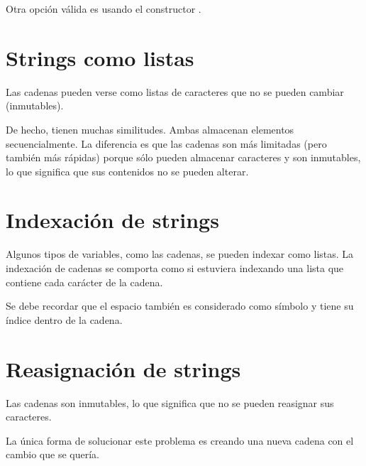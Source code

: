 
Otra opción válida es usando el constructor .


\section{Strings como listas}

Las cadenas pueden verse como listas de caracteres que no se pueden cambiar (inmutables).


De hecho, tienen muchas similitudes. Ambas almacenan elementos secuencialmente. La diferencia es que las cadenas son más limitadas (pero también más rápidas) porque sólo pueden almacenar caracteres y son inmutables, lo que significa que sus contenidos no se pueden alterar.

\section{Indexación de strings}

Algunos tipos de variables, como las cadenas, se pueden indexar como listas. La indexación de cadenas se comporta como si estuviera indexando una lista que contiene cada carácter de la cadena.


Se debe recordar que el espacio \ttt{\qq  \qq} también es considerado como símbolo y tiene su índice dentro de la cadena.\smallskip

\section{Reasignación de strings}

Las cadenas son inmutables, lo que significa que no se pueden reasignar sus caracteres.


La única forma de solucionar este problema es creando una nueva cadena con el cambio que se quería.


